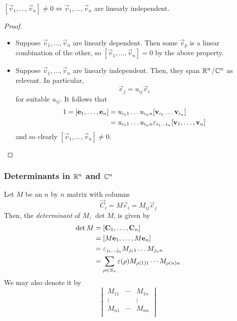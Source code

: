 \documentclass{../../template/note}
\begin{document}
    \begin{proposition}
        \([\vec v_1, \dots, \vec v_n] \neq 0 \iff \vec v_1, \dots, \vec v_n\) are linearly independent.
    \end{proposition}
    
    \begin{proof}
        \begin{itemize}
            \item[\(\implies\)] Suppose \(\vec v_1, \dots, \vec v_n\) are linearly dependent. Then some \(\vec v_p\) is a linear combination of the other, so \([\vec v_1, \dots, \vec v_n] = 0\) by the above property.
            \item[\(\impliedby\)] Suppose \(\vec v_1, \dots, \vec v_n\) are linearly independent. Then, they span \(\mathbb R^n\)/\(\mathbb C^n\) as relevant. In particular,
            \[
                \vec e_j = u_{ij} \vec v_i
            \]
            for suitable \(u_{ij}\). It follows that
            \begin{align*}
                1 = [\vec e_1, \dots, \vec e_n] &= u_{i_11}\dots u_{i_nn} [\vec v_{i_1}\dots \vec v_{i_n}] \\
                &= u_{i_11}\dots u_{i_nn} \lv{i_1\dots i_n}[\vec v_1, \dots, \vec v_n]
            \end{align*}
            and so clearly \([\vec v_1, \dots, \vec v_n] \neq 0\).
        \end{itemize}
    \end{proof}
    
    \subsubsection{Determinants in \(\mathbb R^n\) and \(\mathbb C^n\)}

    \begin{definition}
        Let \(M\) be an \(n\) by \(n\) matrix with columns
        \[
            \vec C_i = M \vec e_i = M_{ij} \vec e_j
        \]
        Then, the \emph{determinant} of \(M\), \(\det M\), is given by
        \begin{align*}
            \det M &= [\vec C_1, \dots, \vec C_n] \\
            &= [M \vec e_1, \dots, M \vec e_n] \\
            &= \lv{j_1\dots j_n}M_{j_11}\dots M_{j_nn} \\
            &= \sum_{\rho \in S_n} \varepsilon(\rho) M_{\rho(1)1}\cdots M_{\rho(n)n}
        \end{align*}
        We may also denote it by
        \[
            \begin{vmatrix}
             M_{11} & \cdots & M_{1n} \\
             \vdots &  & \vdots \\
             M_{n1} & \cdots & M_{nn} \\
            \end{vmatrix}
        \]
    \end{definition}
    
\end{document}
